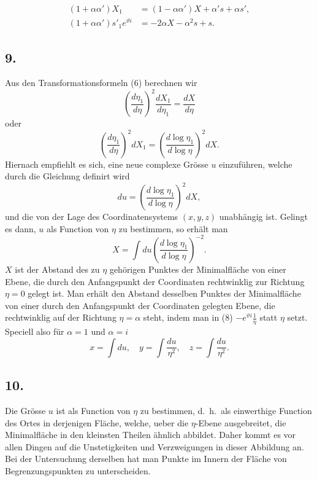 \documentclass[12pt,a4paper]{article}
\begin{document}
\newpage
\begin{equation}\tag{6}
\begin{aligned}
(1 + \alpha\alpha') X_{1} &= (1 - \alpha\alpha') X + \alpha' s + \alpha s', \\
(1 + \alpha\alpha') s'_{1} e^{\vartheta i} &= -2\alpha X - \alpha^{2} s + s.
\end{aligned}
\end{equation}

\subsection*{9.}

Aus den Transformationsformeln (6) berechnen wir
\[\left(\frac{d\eta_{1}}{d\eta}\right)^{2} \frac{dX_{1}}{d\eta_{1}} = \frac{dX}{d\eta}\]
oder
\[\left(\frac{d\eta_{1}}{d\eta}\right)^{2} dX_{1} = \left(\frac{d\log\eta_{1}}{d\log\eta}\right)^{2} dX.\]
Hiernach empfiehlt es sich, eine neue complexe Gr\"osse $u$ einzuf\"uhren, welche durch die Gleichung definirt wird
\begin{equation}\tag{7}
du = \left(\frac{d\log\eta_{1}}{d\log\eta}\right)^{2} dX,
\end{equation}
und die von der Lage des Coordinatensystems $(x,y,z)$ unabh\"angig ist. Gelingt es dann, $u$ als Function von $\eta$ zu bestimmen, so erh\"alt man
\begin{equation}\tag{8}
X = \int du \left(\frac{d\log\eta_{1}}{d\log\eta}\right)^{-2}.
\end{equation}
$X$ ist der Abstand des zu $\eta$ geh\"origen Punktes der Minimalfl\"ache von einer Ebene, die durch den Anfangspunkt der Coordinaten rechtwinklig zur Richtung $\eta = 0$ gelegt ist. Man erh\"alt den Abstand desselben Punktes der Minimalfl\"ache von einer durch den Anfangspunkt der Coordinaten gelegten Ebene, die rechtwinklig auf der Richtung $\eta = \alpha$ steht, indem man in (8) $-e^{\vartheta i}\frac{1}{\eta}$ statt $\eta$ setzt. Speciell also f\"ur $\alpha = 1$ und $\alpha = i$
\begin{equation}\tag{9}
x = \int du, \quad y = \int \frac{du}{\eta^{2}}, \quad z = \int \frac{du}{\eta^{2}}.
\end{equation}

\newpage
\subsection*{10.}

Die Gr\"osse $u$ ist als Function von $\eta$ zu bestimmen, d.\ h.\ als einwerthige Function des Ortes in derjenigen Fl\"ache, welche, ueber die $\eta$-Ebene ausgebreitet, die Minimalfl\"ache in den kleinsten Theilen \"ahnlich abbildet. Daher kommt es vor allen Dingen auf die Unstetigkeiten und Verzweigungen in dieser Abbildung an. Bei der Untersuchung derselben hat man Punkte im Innern der Fl\"ache von Begrenzungspunkten zu unterscheiden.
\end{document}
